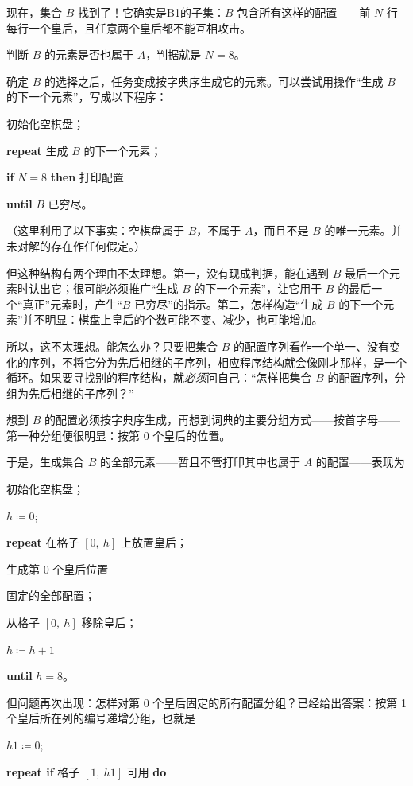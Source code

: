 \documentclass[twoside,11pt,fontset=none]{ctexbook}
\begin{document}
现在，集合 $B$ 找到了！它确实是\hyperref[en:b1-eight-queens]{B1}的子集：$B$ 包含所有这样的配置——前 $N$ 行每行一个皇后，且任意两个皇后都不能互相攻击。

判断 $B$ 的元素是否也属于 $A$，判据就是 $N = 8$。

确定 $B$ 的选择之后，任务变成按字典序生成它的元素。可以尝试用操作“生成 $B$ 的下一个元素”，写成以下程序：

初始化空棋盘；

\textbf{\textbf{repeat}} 生成 $B$ 的下一个元素；

\quad \textbf{if} $N = 8$ \textbf{then} 打印配置

\textbf{until} $B$ 已穷尽。

\noindent
（这里利用了以下事实：空棋盘属于 $B$，不属于 $A$，而且不是 $B$ 的唯一元素。并未对解的存在作任何假定。）

但这种结构有两个理由不太理想。第一，没有现成判据，能在遇到 $B$ 最后一个元素时认出它；很可能必须推广“生成 $B$ 的下一个元素”，让它用于 $B$ 的最后一个“真正”元素时，产生“$B$ 已穷尽”的指示。第二，怎样构造“生成 $B$ 的下一个元素”并不明显：棋盘上皇后的个数可能不变、减少，也可能增加。

所以，这不太理想。能怎么办？只要把集合 $B$ 的配置序列看作一个单一、没有变化的序列，不将它分为先后相继的子序列，相应程序结构就会像刚才那样，是一个循环。如果要寻找别的程序结构，就\textit{必须}问自己：“怎样把集合 $B$ 的配置序列，分组为先后相继的子序列？”

想到 $B$ 的配置必须按字典序生成，再想到词典的主要分组方式——按首字母——第一种分组便很明显：按第 0 个皇后的位置。

于是，生成集合 $B$ 的全部元素——暂且不管打印其中也属于 $A$ 的配置——表现为

初始化空棋盘；

$h \coloneq 0$;

\textbf{repeat} 在格子 $[0,\ h]$ 上放置皇后；

\quad 生成第 0 个皇后位置

\quad\quad 固定的全部配置；

\quad 从格子 $[0,\ h]$ 移除皇后；

\quad $h \coloneq h + 1$

\textbf{until} $h = 8$。

但问题再次出现：怎样对第 0 个皇后固定的所有配置分组？已经给出答案：按第 1 个皇后所在列的编号递增分组，也就是

$h1 \coloneq 0$;

\textbf{repeat if} 格子 $[1,\ h1]$ 可用 \textbf{do}
\end{document}
